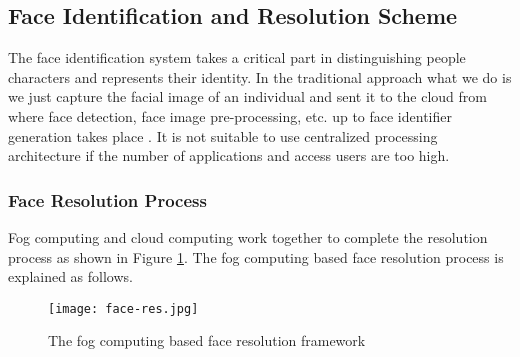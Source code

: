 \documentclass[10pt,a4paper,journal]{IEEEtran}
\begin{document}
\subsection{Face Identification and Resolution Scheme}
\hspace*{1em}	The face identification system takes a critical part in distinguishing people characters and represents their identity. In the traditional approach what we do is we just capture the facial image of an individual and sent it to the cloud from where face detection, face image pre-processing, etc. up to face identifier generation takes place  \cite{8}. It is not suitable to use centralized processing architecture if the number of applications and access users are too high. 
\subsubsection{Face Resolution Process}
	Fog computing and cloud computing work together to complete the resolution process as shown in Figure \ref{Fig 3}. The fog computing based face resolution process is explained as follows.

\begin{figure}
  \centering
	\texttt{[image: face-res.jpg]}
	\caption {The fog computing based face resolution framework  \cite{8}}
\label{Fig 3} 
\end{figure}
\end{document}

